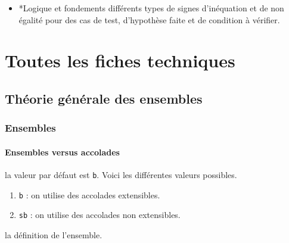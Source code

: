 \documentclass[12pt,a4paper]{book}
\makeatletter
\theoremstyle{definition}
\newcommand\topic{\@ifstar{\@topic@star}{\@topic@no@star}}
\newcommand\@topic@no@star[1]{%
	\textbf{\textsc{#1}.}%
}
\newcommand\@topic@star[1]{%
	\textbf{\textsc{#1} :}%
}
\makeatother
\begin{document}
{{\begin{description}
\begin{itemize}[itemsep=.5em]
    
    
    
        \item \topic*{Logique et fondements}
              différents types de signes d'inéquation et de non égalité pour des cas de test, d'hypothèse faite et de condition à vérifier.
    
    \end{itemize}


\end{description}


\newpage
\chapter{Toutes les fiches techniques} \label{techincal-ids}



















\section{Théorie générale des ensembles}

\subsection{Ensembles}

\subsubsection{Ensembles versus accolades}




\IDoption{} la valeur par défaut est \verb+b+.  Voici les différentes valeurs possibles.
\begin{enumerate}
	\item \verb+b+ : on utilise des accolades extensibles.

	\item \verb+sb+ : on utilise des accolades non extensibles.
\end{enumerate}

\IDarg{} la définition de l'ensemble.

}}
\end{document}
